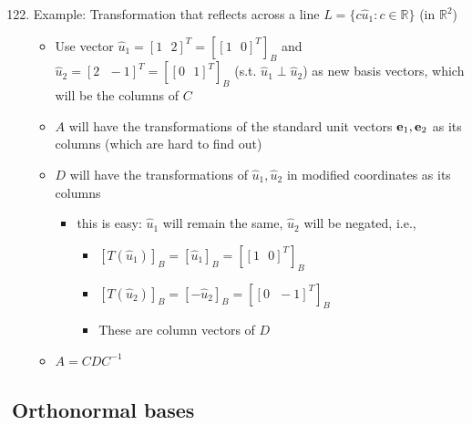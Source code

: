 \documentclass[10pt,letterpaper]{article}
\begin{document}
\begin{enumerate}
\setcounter{enumi}{121}
\item  Example: Transformation that reflects across a line $L=\{c \hat u_1 : c \in \mathbb{R}\}$  (in $\mathbb{R}^{2}$)

\begin{itemize}
\item Use vector $\hat u_1= [1 \text{ }2] ^{T} = [[1 \text{ } 0] ^{T}]_B$ and $\hat u_2 = [2 \text{ } -1] ^{T} = [[0 \text{ } 1] ^{T}]_B$ (s.t. $\hat u_1 \perp \hat u_2$) as new basis vectors, which will be the columns of $C$
\item $A$ will have the transformations of the standard unit vectors ${\bf e} _{1}, {\bf e} _{2}$ as its columns (which are hard to find out)
\item $D$ will have the transformations of $\hat u _{1}, \hat u _{2}$ in modified coordinates as its columns

\begin{itemize}
\item this is easy: $\hat u _{1}$ will remain the same, $\hat u _{2}$ will be negated, i.e.,

\begin{itemize}
\item $[T(\hat u _{1} )]_B = [ \hat u _{1} ]_B = [ [1 \text{ } 0] ^{T} ]_B$
\item $[T(\hat u _{2} )]_B = [ -\hat u _{2} ]_B = [ [0 \text{ } -1] ^{T} ]_B$
\item These are column vectors of $D$
\end{itemize}

\end{itemize}

\item $A=CDC ^{-1}$
\end{itemize}

\end{enumerate}
\subsection{Orthonormal bases}
\label{sec-1_10}
\end{document}
